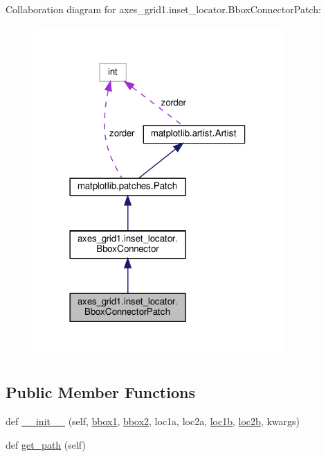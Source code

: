 Collaboration diagram for axes\+\_\+grid1.\+inset\+\_\+locator.\+Bbox\+Connector\+Patch\+:
\nopagebreak
\begin{figure}[H]
\begin{center}
\leavevmode
\includegraphics[width=270pt]{classaxes__grid1_1_1inset__locator_1_1BboxConnectorPatch__coll__graph}
\end{center}
\end{figure}
\subsection*{Public Member Functions}
\begin{DoxyCompactItemize}
\item 
def \hyperlink{classaxes__grid1_1_1inset__locator_1_1BboxConnectorPatch_ad6a0fc5a7438f4c6b402a6006e953e9c}{\+\_\+\+\_\+init\+\_\+\+\_\+} (self, \hyperlink{classaxes__grid1_1_1inset__locator_1_1BboxConnector_a63b35233dec9f318cdc800f53aef552b}{bbox1}, \hyperlink{classaxes__grid1_1_1inset__locator_1_1BboxConnector_aaa2486406736d2f2229ef0ac71b49c30}{bbox2}, loc1a, loc2a, \hyperlink{classaxes__grid1_1_1inset__locator_1_1BboxConnectorPatch_a08064f4f6cbf2a6839d434313c59ce92}{loc1b}, \hyperlink{classaxes__grid1_1_1inset__locator_1_1BboxConnectorPatch_aa9eeb94282e8dbe4c15d1d7e1f2b7299}{loc2b}, kwargs)
\item 
def \hyperlink{classaxes__grid1_1_1inset__locator_1_1BboxConnectorPatch_aae1ec15e58fe97285b3d3809c3f72185}{get\+\_\+path} (self)
\end{DoxyCompactItemize}
